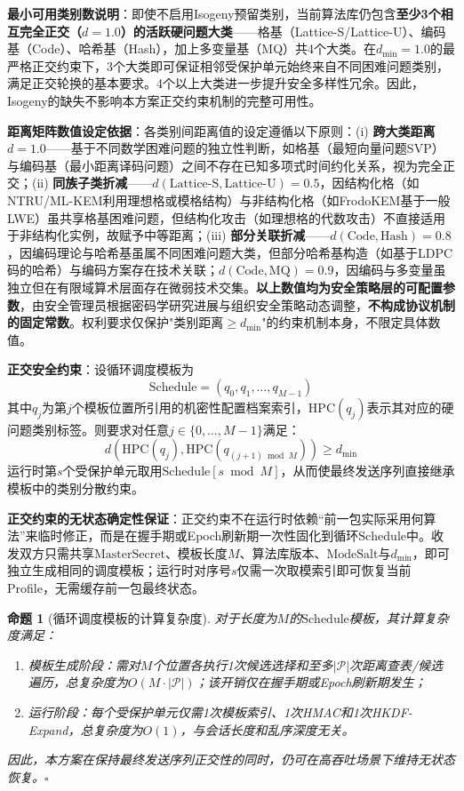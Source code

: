 ﻿\documentclass[12pt,a4paper]{article}
\newtheorem{proposition}{命题}
\begin{document}
\textbf{最小可用类别数说明}：即使不启用Isogeny预留类别，当前算法库仍包含\textbf{至少3个相互完全正交（$d=1.0$）的活跃硬问题大类}——格基（Lattice-S/Lattice-U）、编码基（Code）、哈希基（Hash），加上多变量基（MQ）共4个大类。在$d_{\min}=1.0$的最严格正交约束下，3个大类即可保证相邻受保护单元始终来自不同困难问题类别，满足正交轮换的基本要求。4个以上大类进一步提升安全多样性冗余。因此，Isogeny的缺失不影响本方案正交约束机制的完整可用性。

\textbf{距离矩阵数值设定依据}：各类别间距离值的设定遵循以下原则：(i) \textbf{跨大类距离$d=1.0$}——基于不同数学困难问题的独立性判断，如格基（最短向量问题SVP）与编码基（最小距离译码问题）之间不存在已知多项式时间约化关系，视为完全正交；(ii) \textbf{同族子类折减}——$d(\text{Lattice-S}, \text{Lattice-U})=0.5$，因结构化格（如NTRU/ML-KEM利用理想格或模格结构）与非结构化格（如FrodoKEM基于一般LWE）虽共享格基困难问题，但结构化攻击（如理想格的代数攻击）不直接适用于非结构化实例，故赋予中等距离；(iii) \textbf{部分关联折减}——$d(\text{Code}, \text{Hash})=0.8$，因编码理论与哈希基虽属不同困难问题大类，但部分哈希基构造（如基于LDPC码的哈希）与编码方案存在技术关联；$d(\text{Code}, \text{MQ})=0.9$，因编码与多变量虽独立但在有限域算术层面存在微弱技术交集。\textbf{以上数值均为安全策略层的可配置参数}，由安全管理员根据密码学研究进展与组织安全策略动态调整，\textbf{不构成协议机制的固定常数}。权利要求仅保护"类别距离$\geq d_{\min}$"的约束机制本身，不限定具体数值。

\textbf{正交安全约束}：设循环调度模板为
\begin{equation}
    \text{Schedule} = (q_0, q_1, \ldots, q_{M-1})
\end{equation}
其中$q_j$为第$j$个模板位置所引用的机密性配置档案索引，$\mathrm{HPC}(q_j)$表示其对应的硬问题类别标签。则要求对任意$j \in \{0,\ldots,M-1\}$满足：
\begin{equation}\label{eq:constraint}
    d(\mathrm{HPC}(q_j), \mathrm{HPC}(q_{(j+1)\bmod M})) \geq d_{\min}
\end{equation}
运行时第$s$个受保护单元取用$\text{Schedule}[s \bmod M]$，从而使最终发送序列直接继承模板中的类别分散约束。

\textbf{正交约束的无状态确定性保证}：正交约束不在运行时依赖“前一包实际采用何算法”来临时修正，而是在握手期或Epoch刷新期一次性固化到循环$\text{Schedule}$中。收发双方只需共享$\text{MasterSecret}$、模板长度$M$、算法库版本、$\text{ModeSalt}$与$d_{\min}$，即可独立生成相同的调度模板；运行时对序号$s$仅需一次取模索引即可恢复当前Profile，无需缓存前一包最终状态。

\begin{proposition}[循环调度模板的计算复杂度]
对于长度为$M$的$\text{Schedule}$模板，其计算复杂度满足：
\begin{enumerate}[label=(\alph*)]
    \item 模板生成阶段：需对$M$个位置各执行1次候选选择和至多$|\mathcal{P}|$次距离查表/候选遍历，总复杂度为$O(M \cdot |\mathcal{P}|)$；该开销仅在握手期或Epoch刷新期发生；
    \item 运行阶段：每个受保护单元仅需1次模板索引、1次HMAC和1次HKDF-Expand，总复杂度为$O(1)$，与会话长度和乱序深度无关。
\end{enumerate}
因此，本方案在保持最终发送序列正交性的同时，仍可在高吞吐场景下维持无状态恢复。$\square$
\end{proposition}
\end{document}
